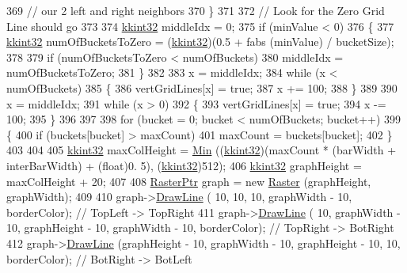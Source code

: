 \begin{DoxyCode}
369                                               \textcolor{comment}{// our 2 left and right neighbors}
370   \}
371 
372   \textcolor{comment}{// Look for the Zero Grid Line should go}
373 
374   \hyperlink{namespace_k_k_b_a8fa4952cc84fda1de4bec1fbdd8d5b1b}{kkint32}  middleIdx = 0;
375   \textcolor{keywordflow}{if}  (minValue < 0)
376   \{
377     \hyperlink{namespace_k_k_b_a8fa4952cc84fda1de4bec1fbdd8d5b1b}{kkint32}  numOfBucketsToZero = (\hyperlink{namespace_k_k_b_a8fa4952cc84fda1de4bec1fbdd8d5b1b}{kkint32})(0.5 + fabs (minValue) / bucketSize);
378 
379     \textcolor{keywordflow}{if}  (numOfBucketsToZero < numOfBuckets)
380       middleIdx = numOfBucketsToZero;
381   \}
382 
383   x = middleIdx;
384   \textcolor{keywordflow}{while}  (x < numOfBuckets)
385   \{
386     vertGridLines[x] = \textcolor{keyword}{true};
387     x += 100;
388   \}
389 
390   x = middleIdx;
391   \textcolor{keywordflow}{while}  (x > 0)
392   \{
393     vertGridLines[x] = \textcolor{keyword}{true};
394     x -= 100;
395   \}
396   
397 
398   \textcolor{keywordflow}{for}  (bucket = 0;  bucket < numOfBuckets;  bucket++)
399   \{
400     \textcolor{keywordflow}{if}  (buckets[bucket] > maxCount)
401       maxCount = buckets[bucket];
402   \}
403 
404 
405   \hyperlink{namespace_k_k_b_a8fa4952cc84fda1de4bec1fbdd8d5b1b}{kkint32}  maxColHeight = \hyperlink{namespace_k_k_b_ad030d1ca8bd5038824c4a923a4d23fb5}{Min} ((\hyperlink{namespace_k_k_b_a8fa4952cc84fda1de4bec1fbdd8d5b1b}{kkint32})(maxCount * (barWidth + interBarWidth) + (\textcolor{keywordtype}{float})0.
      5), (\hyperlink{namespace_k_k_b_a8fa4952cc84fda1de4bec1fbdd8d5b1b}{kkint32})512);
406   \hyperlink{namespace_k_k_b_a8fa4952cc84fda1de4bec1fbdd8d5b1b}{kkint32}  graphHeight = maxColHeight + 20;
407 
408   \hyperlink{class_k_k_b_1_1_raster}{RasterPtr}  graph = \textcolor{keyword}{new} \hyperlink{class_k_k_b_1_1_raster}{Raster} (graphHeight, graphWidth);
409 
410   graph->\hyperlink{class_k_k_b_1_1_raster_a118bf0fa32356ddea42f579c044c65cd}{DrawLine} (              10,              10,               10, graphWidth - 10, 
      borderColor);  \textcolor{comment}{// TopLeft  -> TopRight}
411   graph->\hyperlink{class_k_k_b_1_1_raster_a118bf0fa32356ddea42f579c044c65cd}{DrawLine} (              10, graphWidth - 10, graphHeight - 10, graphWidth - 10, 
      borderColor);  \textcolor{comment}{// TopRight -> BotRight}
412   graph->\hyperlink{class_k_k_b_1_1_raster_a118bf0fa32356ddea42f579c044c65cd}{DrawLine} (graphHeight - 10, graphWidth - 10, graphHeight - 10,              10, 
      borderColor);  \textcolor{comment}{// BotRight -> BotLeft}

\end{DoxyCode}
